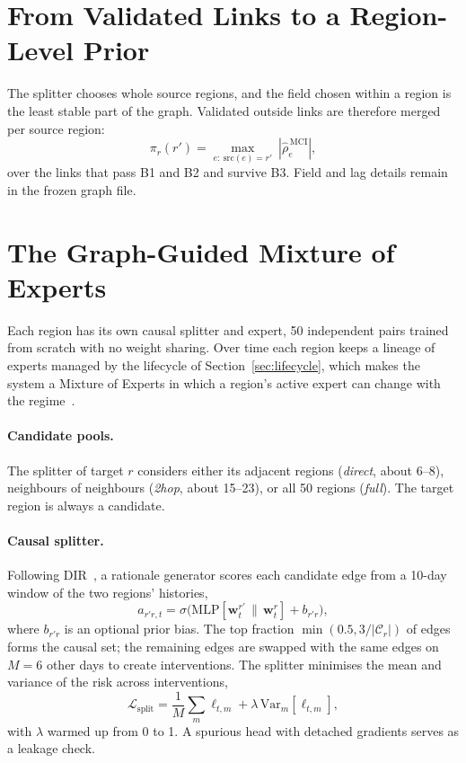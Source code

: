 \section{From Validated Links to a Region-Level Prior}
\label{sec:moe-prior}

The splitter chooses whole source regions, and the field chosen within a region is the least stable part of the graph. Validated outside links are therefore merged per source region:
\begin{equation}
  \pi_r(r')=\max_{e:\ \mathrm{src}(e)=r'}\ |\hat\rho^{\,\mathrm{MCI}}_e|,
  \label{eq:prior}
\end{equation}
over the links that pass B1 and B2 and survive B3. Field and lag details remain in the frozen graph file.

\section{The Graph-Guided Mixture of Experts}
\label{sec:moe-arch}

Each region has its own causal splitter and expert, 50 independent pairs trained from scratch with no weight sharing. Over time each region keeps a lineage of experts managed by the lifecycle of Section~\ref{sec:lifecycle}, which makes the system a Mixture of Experts in which a region's active expert can change with the regime~\cite{jacobs1991adaptive}.

\paragraph{Candidate pools.} The splitter of target $r$ considers either its adjacent regions (\emph{direct}, about 6--8), neighbours of neighbours (\emph{2hop}, about 15--23), or all 50 regions (\emph{full}). The target region is always a candidate.

\label{sec:moe-splitter}
\paragraph{Causal splitter.} Following DIR~\cite{wu2022discovering}, a rationale generator scores each candidate edge from a 10-day window of the two regions' histories,
\begin{equation}
  a_{r'r,t}=\sigma\big(\mathrm{MLP}[\mathbf{w}^{r'}_t\,\|\,\mathbf{w}^{r}_t]+b_{r'r}\big),
  \label{eq:score}
\end{equation}
where $b_{r'r}$ is an optional prior bias. The top fraction $\min(0.5,3/|\mathcal{C}_r|)$ of edges forms the causal set; the remaining edges are swapped with the same edges on $M=6$ other days to create interventions. The splitter minimises the mean and variance of the risk across interventions,
\begin{equation}
  \mathcal{L}_{\mathrm{split}}=\frac{1}{M}\sum_{m}\ell_{t,m}+\lambda\,\mathrm{Var}_m[\ell_{t,m}],
  \label{eq:dirloss}
\end{equation}
with $\lambda$ warmed up from 0 to 1. A spurious head with detached gradients serves as a leakage check.

